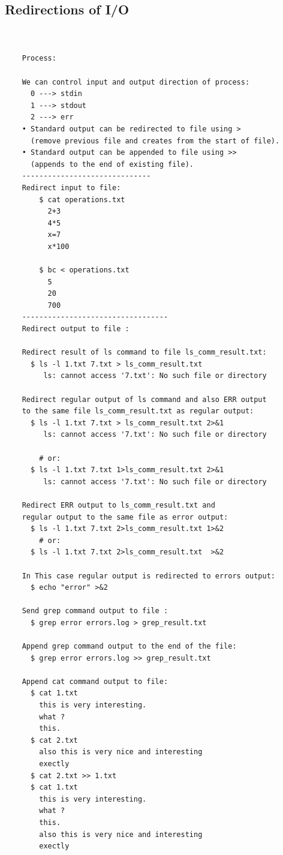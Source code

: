 \documentclass[a4paper,12pt]{article}
\begin{document}
\subsection{Redirections of I/O }
\begin{verbatim}
    

    Process:    
    
    We can control input and output direction of process:    
      0 ---> stdin
      1 ---> stdout
      2 ---> err    
    • Standard output can be redirected to file using > 
      (remove previous file and creates from the start of file).
    • Standard output can be appended to file using >> 
      (appends to the end of existing file).
    ------------------------------
    Redirect input to file:  
        $ cat operations.txt
          2+3
          4*5
          x=7
          x*100
﻿
        $ bc < operations.txt
          5
          20
          700    
    ----------------------------------
    Redirect output to file : 
      
    Redirect result of ls command to file ls_comm_result.txt:
      $ ls -l 1.txt 7.txt > ls_comm_result.txt
         ls: cannot access '7.txt': No such file or directory
    
    Redirect regular output of ls command and also ERR output 
    to the same file ls_comm_result.txt as regular output: 
      $ ls -l 1.txt 7.txt > ls_comm_result.txt 2>&1
         ls: cannot access '7.txt': No such file or directory      

        # or:
      $ ls -l 1.txt 7.txt 1>ls_comm_result.txt 2>&1
         ls: cannot access '7.txt': No such file or directory      

    Redirect ERR output to ls_comm_result.txt and 
    regular output to the same file as error output:  
      $ ls -l 1.txt 7.txt 2>ls_comm_result.txt 1>&2
        # or:
      $ ls -l 1.txt 7.txt 2>ls_comm_result.txt  >&2

    In This case regular output is redirected to errors output: 
      $ echo "error" >&2 
    
    Send grep command output to file :
      $ grep error errors.log > grep_result.txt
    
    Append grep command output to the end of the file: 
      $ grep error errors.log >> grep_result.txt
     
    Append cat command output to file: 
      $ cat 1.txt
        this is very interesting.
        what ?
        this.
      $ cat 2.txt
        also this is very nice and interesting
        exectly
      $ cat 2.txt >> 1.txt
      $ cat 1.txt
        this is very interesting.
        what ?
        this.
        also this is very nice and interesting
        exectly     
    

\end{verbatim}
\end{document}
